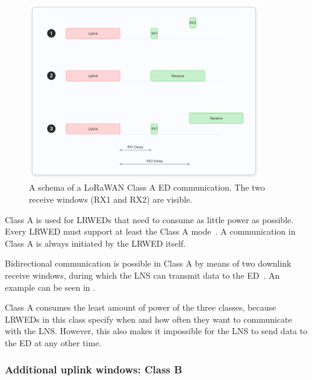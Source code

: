 \begin{figure}[htbp]
    \centering
    \includegraphics[width=0.9\textwidth]{pictures/device-classes/class-a.png}
    \caption[Schema of a \ac{LoRaWAN} Class A \acl{ED} communication]{
        A schema of a \ac{LoRaWAN} Class A \acl{ED} communication.
        The two receive windows (RX1 and RX2) are visible.~\protect\cite{the_things_industries_bv_device_nodate}
    }\label{pic:lorawan-device-class-a-schema}
\end{figure}

Class A is used for \aclp{LRWED} that need to consume as little power as possible.
Every \acl{LRWED} must support at least the Class A mode~\cite[p. 11]{lora_alliance_inc_lorawan_specification_2017}.
A communication in Class A is always initiated by the \acl{LRWED} itself.

Bidirectional communication is possible in Class A by means of two downlink receive windows, during which the \ac{LNS} can transmit data to the \acl{ED}~\cite[p. 13]{lora_alliance_inc_lorawan_specification_2017}.
An example can be seen in .

Class A consumes the least amount of power of the three classes, because \aclp{LRWED} in this class specify when and how often they want to communicate with the \ac{LNS}.
However, this also makes it impossible for the \ac{LNS} to send data to the \acl{ED} at any other time.

\subsubsection{Additional uplink windows: Class B}

